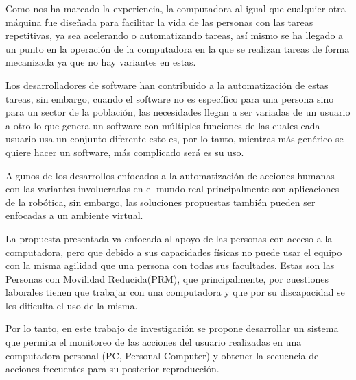 
Como nos ha marcado la experiencia, la computadora al igual que cualquier otra
 máquina fue diseñada para facilitar la vida de las personas con las tareas
 repetitivas, ya sea acelerando o automatizando tareas, así mismo se ha llegado
 a un punto en la operación de la computadora en la que se realizan tareas de
 forma mecanizada ya que no hay variantes en estas.  

Los desarrolladores de software han contribuido a la automatización de estas
 tareas, sin embargo, cuando el software no es específico para una persona
 sino para un sector de la población, las necesidades llegan a ser variadas
 de un usuario a otro lo que genera un software con múltiples funciones de las
 cuales cada usuario usa un conjunto diferente esto es, por lo tanto,
 mientras más genérico se quiere hacer un software, más complicado será es su
 uso. 

Algunos de los desarrollos enfocados a la automatización de acciones humanas
 con las variantes involucradas en el mundo real principalmente son 
 aplicaciones de la robótica, sin embargo, las soluciones propuestas también
 pueden ser enfocadas a un ambiente virtual.

La propuesta presentada va enfocada al apoyo de las personas con acceso a la
 computadora, pero que debido a sus capacidades físicas no puede usar el equipo
 con la misma agilidad que una persona con todas sus facultades. Estas son las
 Personas con Movilidad Reducida(PRM), que principalmente, por cuestiones
 laborales tienen que trabajar con una computadora y que por su discapacidad se
 les dificulta el uso de la misma.

Por lo tanto, en este trabajo de investigación se propone desarrollar un sistema
 que permita el monitoreo de las acciones del usuario realizadas en una
 computadora personal (PC, Personal Computer) y obtener la secuencia de acciones
 frecuentes para su posterior reproducción.